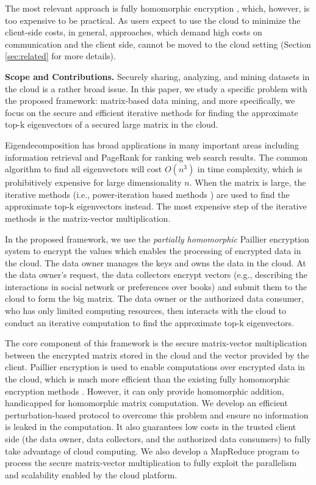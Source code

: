 \documentclass[10pt, conference, compsocconf]{IEEEtran}
\begin{document}
The most relevant approach is fully homomorphic encryption \cite{gentry09,naehrig11}, which, however, is too expensive to be practical. As users expect to use the cloud to minimize the client-side costs, in general, approaches, which demand high costs on communication and the client side, cannot be moved to the cloud setting (Section \ref{sec:related} for more details).   

\textbf{Scope and Contributions.} Securely sharing, analyzing, and mining datasets in the cloud is a rather broad issue. In this paper, we study a specific problem with the proposed framework: matrix-based data mining, and more specifically, we focus on the secure and efficient iterative methods for finding the approximate top-k eigenvectors of a secured large matrix in the cloud. 

Eigendecomposition \cite{saad11} has broad applications in many important areas including information retrieval \cite{deerwester90} and PageRank \cite{brin98} for ranking web search results. The common algorithm to find all eigenvectors will cost $O(n^3)$ in time complexity, which is prohibitively expensive for large dimensionality $n$. When the matrix is large, the iterative methods (i.e., power-iteration based methods \cite{arnoldi51,cullum85}) are used to find the approximate top-k eigenvectors instead. The most expensive step of the iterative methods is the matrix-vector multiplication.    



In the proposed framework, we use the \emph{partially homomorphic} Paillier encryption system \cite{paillier99} to encrypt the values which enables the processing of encrypted data in the cloud. The data owner manages the keys and owns the data in the cloud. At the data owner's request, the data collectors encrypt vectors (e.g., describing the interactions in social network or preferences over books) and submit them to the cloud to form the big matrix. The data owner or the authorized data consumer, who has only limited computing resources, then interacts with the cloud to conduct an iterative computation to find the approximate top-k eigenvectors. 

The core component of this framework is the secure matrix-vector multiplication between the encrypted matrix stored in the cloud and the vector provided by the client. Paillier encryption is used to enable computations over encrypted data in the cloud, which is much more efficient than the existing fully homomorphic encryption methods \cite{gentry09}. However, it can only provide homomorphic addition, handicapped for homomorphic matrix computation. We develop an efficient perturbation-based protocol to overcome this problem and ensure no information is leaked in the computation. It also guarantees low costs  in the trusted client side (the data owner, data collectors, and the authorized data consumers) to fully take advantage of cloud computing. We also develop a MapReduce program to process the secure matrix-vector multiplication to fully exploit the parallelism and scalability enabled by the cloud platform. 
\end{document}

